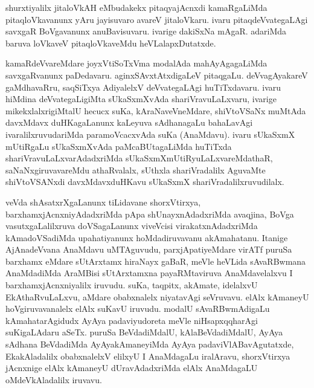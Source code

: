 \begin{artha}
shurxtiyalilx jitaloVkAH eMbudakekx pitaqyajAcnxdi kamaRgaLiMda pitaqloVkavanunx yAru jayisuvaro avareV jitaloVkaru. ivaru pitaqdeVvategaLAgi savxgaR BoVgavanunx anuBavisuvaru. ivarige dakiSxNa mAgaR. adariMda baruva loVkaveV pitaqloVkaveMdu heVLalapxDutatxde. 
\end{artha}

\begin{artha}
kamaRdeVvareMdare joyxVtiSoTxVma modalAda mahAyAgagaLiMda savxgaRvanunx paDedavaru. aginxSAvxtAtxdigaLeV pitaqgaLu. deVvagAyakareV gaMdhavaRru, saqSiTxya AdiyalelxV deVvategaLAgi huTiTxdavaru. ivaru hiMdina deVvategaLigiMta sUkaSxmXvAda shariVravuLaLxvaru, ivarige mikekxlalxrigiMtalU hecucx suKa, kAraNaveVneMdare, shiVtoVSaNx muMtAda davxMdavx duHKagaLanunx kaLeyuva sAdhanagaLu bahaLavAgi ivaralilxruvudariMda paramoVcacxvAda suKa (AnaMdavu). ivaru sUkaSxmX mUtiRgaLu sUkaSxmXvAda paMcaBUtagaLiMda huTiTxda shariVravuLaLxvarAdadxriMda sUkaSxmXmUtiRyuLaLxvareMdathaR, saNaNxgiruvavareMdu athaRvalalx, sUthxla shariVradalilx AguvaMte shiVtoVSANxdi davxMdavxduHKavu sUkaSxmX shariVradalilxruvudilalx. 
\end{artha}%

\begin{artha}
veVda shAsatxrXgaLanunx tiLidavane shorxVtirxya, barxhamxjAcnxniyAdadxriMda pApa shUnayxnAdadxriMda avaqjina, BoVga vasutxgaLalilxruva doVSagaLanunx viveVcisi virakatxnAdadxriMda kAmadoVSadiMda upahatiyanunx hoMdadiruvavanu akAmahatanu. Itanige AjAnadeVvana AnaMdavu uMTAguvudu, parxjApatiyeMdare virATf puruSa barxhamx eMdare sUtArxtamx hiraNayx gaBaR, meVle heVLida sAvaRBwmana AnaMdadiMda AraMBisi sUtArxtamxna payaRMtaviruva AnaMdavelalxvu I barxhamxjAcnxniyalilx iruvudu. suKa, taqpitx, akAmate, idelalxvU EkAthaRvuLaLxvu, aMdare obabxnalelx niyatavAgi seVruvavu. elAlx kAmaneyU hoVgiruvavanalelx elAlx suKavU iruvudu. modalU sAvaRBwmAdigaLu kAmahatarAgidudx AyAya padaviyudoreta meVle niHsapxqqharAgi suKigaLAdaru aSeTx. puruSa BeVdadiMdalU, kAlaBeVdadiMdalU, AyAya sAdhana BeVdadiMda AyAyakAmaneyiMda AyAya padaviVlABavAgutatxde, EkakAladalilx obabxnalelxV elilxyU I AnaMdagaLu iralAravu, shorxVtirxya jAcnxnige elAlx kAmaneyU dUravAdadxriMda elAlx AnaMdagaLU oMdeVkAladalilx iruvavu.
\end{artha}


